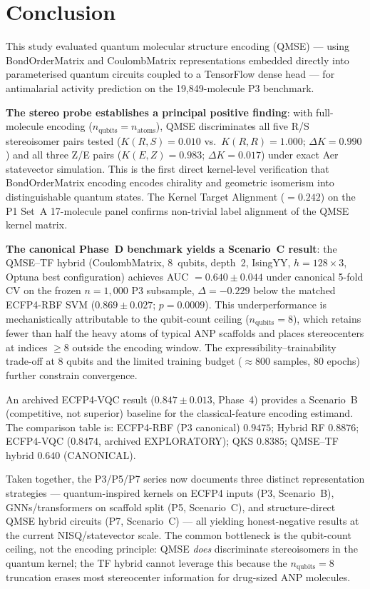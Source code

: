 \section{Conclusion}
\label{sec:conclusion}

This study evaluated quantum molecular structure encoding (QMSE) --- using
BondOrderMatrix and CoulombMatrix representations embedded directly into
parameterised quantum circuits coupled to a TensorFlow dense head ---
for antimalarial activity prediction on the 19{,}849-molecule P3 benchmark.

\textbf{The stereo probe establishes a principal positive finding}: with
full-molecule encoding ($n_{\text{qubits}} = n_{\text{atoms}}$), QMSE
discriminates all five R/S stereoisomer pairs tested ($K(R,S) = 0.010$ vs.\
$K(R,R) = 1.000$; $\Delta K = 0.990$) and all three Z/E pairs
($K(E,Z) = 0.983$; $\Delta K = 0.017$) under exact Aer statevector
simulation. This is the first direct kernel-level verification that
BondOrderMatrix encoding encodes chirality and geometric isomerism into
distinguishable quantum states. The Kernel Target Alignment ($= 0.242$)
on the P1 Set~A 17-molecule panel confirms non-trivial label alignment
of the QMSE kernel matrix.

\textbf{The canonical Phase~D benchmark yields a Scenario~C result}: the
QMSE--TF hybrid (CoulombMatrix, 8~qubits, depth~2, IsingYY, $h = 128 \times 3$,
Optuna best configuration) achieves AUC $= 0.640 \pm 0.044$ under canonical
5-fold CV on the frozen $n = 1{,}000$ P3 subsample, $\Delta = -0.229$
below the matched ECFP4-RBF SVM ($0.869 \pm 0.027$; $p = 0.0009$).
This underperformance is mechanistically attributable to the qubit-count
ceiling ($n_{\text{qubits}} = 8$), which retains fewer than half the heavy
atoms of typical ANP scaffolds and places stereocenters at indices $\geq 8$
outside the encoding window. The expressibility--trainability trade-off at
8 qubits and the limited training budget ($\approx 800$ samples, 80 epochs)
further constrain convergence.

An archived ECFP4-VQC result ($0.847 \pm 0.013$, Phase~4) provides a
Scenario~B (competitive, not superior) baseline for the classical-feature
encoding estimand. The comparison table is:
ECFP4-RBF (P3 canonical) $0.9475$;
Hybrid RF $0.8876$;
ECFP4-VQC ($0.8474$, archived EXPLORATORY);
QKS $0.8385$;
QMSE--TF hybrid $0.640$ (CANONICAL).

Taken together, the P3/P5/P7 series now documents three distinct
representation strategies --- quantum-inspired kernels on ECFP4 inputs (P3,
Scenario~B), GNNs/transformers on scaffold split (P5, Scenario~C),
and structure-direct QMSE hybrid circuits (P7, Scenario~C) --- all
yielding honest-negative results at the current NISQ/statevector scale.
The common bottleneck is the qubit-count ceiling, not the encoding
principle: QMSE \emph{does} discriminate stereoisomers in the quantum
kernel; the TF hybrid cannot leverage this because the $n_{\text{qubits}} = 8$
truncation erases most stereocenter information for drug-sized ANP molecules.

